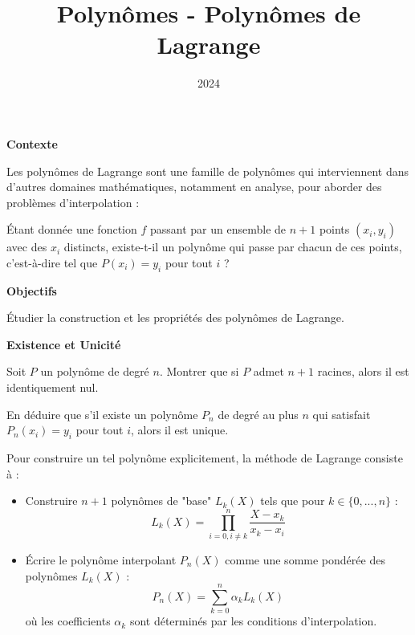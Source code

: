 \documentclass[10pt,a4paper]{article}
\title{Polynômes - Polynômes de Lagrange}
\author{}
\date{2024}
\begin{document}

\bigskip
\textbf{Contexte}

Les polynômes de Lagrange sont une famille de polynômes qui interviennent dans d'autres domaines
mathématiques, notamment en analyse, pour aborder des problèmes d'interpolation :

Étant donnée une fonction $f$ passant par un ensemble de $n+1$ points $ (x_i, y_i) $ avec des $x_i$
distincts, existe-t-il un polynôme qui passe par chacun de ces points, c'est-à-dire tel que $P(x_i)
= y_i$ pour tout $i$ ?


\bigskip
\textbf{Objectifs}

Étudier la construction et les propriétés des polynômes de Lagrange.

\bigskip
\textbf{Existence et Unicité}


\q Soit $P$ un polynôme de degré $n$. Montrer que si $P$ admet $n+1$ racines, alors il est
identiquement nul.

\q En déduire que s'il existe un polynôme $P_n$ de degré au plus $n$ qui satisfait $P_n(x_i) = y_i$
pour tout $i$, alors il est unique.

\bigskip

Pour construire un tel polynôme explicitement, la méthode de Lagrange consiste à :
\begin{itemize}
   \item Construire $n + 1$ polynômes de "base" \( L_k(X) \) tels que pour $k \in \{0, ..., n\}$ :
   $$L_k(X) = \prod_{i=0, i\neq k}^n \frac{X-x_k}{x_k-x_i}$$
   \item Écrire le polynôme interpolant \( P_n(X) \) comme une somme pondérée des polynômes \(
   L_k(X) \) :
   $$P_n(X) = \sum_{k=0}^n \alpha_k L_k(X)$$
   où les coefficients \( \alpha_k \) sont déterminés par les conditions d'interpolation.
\end{itemize}
\end{document}
